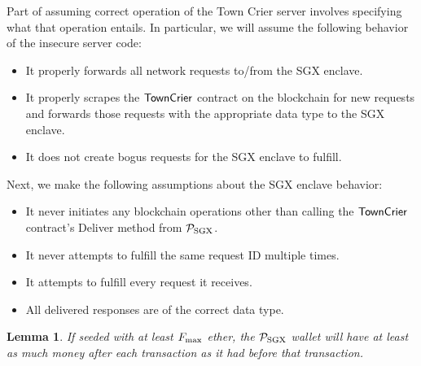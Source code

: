 \documentclass[letterpaper,twocolumn,10pt]{article}
\newtheorem{lemma}{Lemma}
\begin{document}
Part of assuming correct operation of the Town Crier server involves specifying what that operation entails.
In particular, we will assume the following behavior of the insecure server code:
\begin{itemize}
  \item It properly forwards all network requests to/from the SGX enclave.
  \item It properly scrapes the ${\sf TownCrier}$ contract on the blockchain for new requests and forwards those requests with the appropriate data type to the SGX enclave.
  \item It does not create bogus requests for the SGX enclave to fulfill.
\end{itemize}
Next, we make the following assumptions about the SGX enclave behavior:
\begin{itemize}
  \item It never initiates any blockchain operations other than calling the ${\sf TownCrier}$ contract's Deliver method from $\mathcal{P}_{\rm SGX}$.
  \item It never attempts to fulfill the same request ID multiple times.
  \item It attempts to fulfill every request it receives.
  \item All delivered responses are of the correct data type.
\end{itemize}

\begin{lemma} \label{0:non-bankrupt-adf}
If seeded with at least $F_{\rm max}$ ether, the $\mathcal{P}_{\rm SGX}$ wallet will have
at least as much money after each transaction as it had before that transaction.
\end{lemma}
\end{document}
